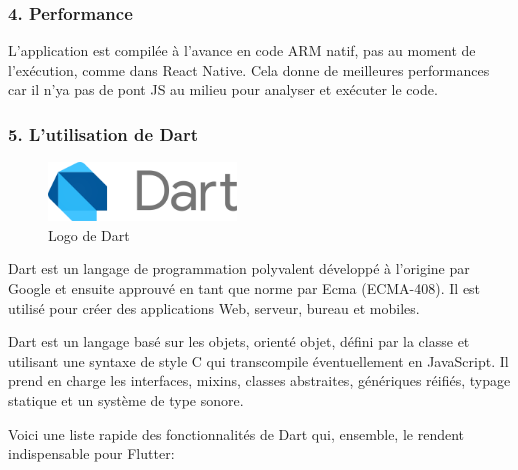\subsubsection{4. Performance}
L'application est compilée à l'avance en code ARM natif, pas au moment de l'exécution, comme dans React Native. Cela donne de meilleures performances car il n’ya pas de pont JS au milieu pour analyser et exécuter le code.

\subsubsection{5. L'utilisation de Dart}

\begin{figure}
	\includegraphics[width=5cm]{Images/chapter2/dart_logo.png}
	\caption{{\footnotesize Logo de Dart}}
\end{figure}

Dart est un langage de programmation polyvalent développé à l'origine par Google et ensuite approuvé en tant que norme par Ecma (ECMA-408). Il est utilisé pour créer des applications Web, serveur, bureau et mobiles.

Dart est un langage basé sur les objets, orienté objet, défini par la classe et utilisant une syntaxe de style C qui transcompile éventuellement en JavaScript. Il prend en charge les interfaces, mixins, classes abstraites, génériques réifiés, typage statique et un système de type sonore.\cite{noauthor_dart_2019}\medskip

Voici une liste rapide des fonctionnalités de Dart qui, ensemble, le rendent indispensable pour Flutter:

